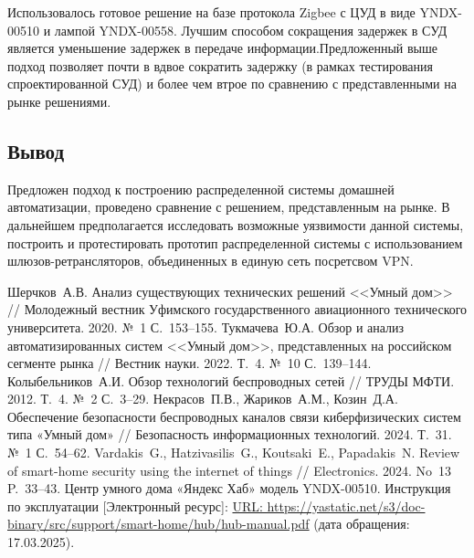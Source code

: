 \documentclass[a4paper,12pt]{article}
\begin{document}
Использовалось готовое решение на базе протокола Zigbee с ЦУД в виде YNDX-00510 \cite{YNDX_hub} и
лампой YNDX-00558. Лучшим способом сокращения задержек в СУД является уменьшение задержек в передаче
информации.Предложенный выше подход позволяет почти в вдвое сократить задержку (в рамках тестирования спроектированной
СУД) и более чем втрое по сравнению с представленными на рынке решениями.

\subsection{Вывод}
Предложен подход к построению распределенной системы домашней автоматизации, проведено сравнение с решением,
представленным на рынке. В дальнейшем предполагается исследовать возможные
уязвимости данной системы, построить и протестировать прототип распределенной системы с использованием шлюзов-ретрансляторов,
объединенных в единую сеть посретсвом VPN.

\newpage
\begin{thebibliography}{40}
 Шерчков~А.\:В. Анализ существующих технических решений <<Умный дом>> // Молодежный вестник Уфимского государственного авиационного технического университета. 2020. №~1 С.~153--155.
 Тукмачева~Ю.\:А. Обзор и анализ автоматизированных систем <<Умный дом>>, представленных на российском сегменте рынка // Вестник науки. 2022. Т.~4. №~10 С.~139--144.
 Колыбельников~А.\:И. Обзор технологий беспроводных сетей // ТРУДЫ МФТИ. 2012. Т.~4. №~2 С.~3--29.
 Некрасов~П.\:В., Жариков~А.\:М., Козин~Д.\:А. Обеспечение безопасности беспроводных каналов связи киберфизических систем типа «Умный дом» // Безопасность информационных технологий. 2024. Т.~31. №~1 С.~54--62.
 Vardakis~G., Hatzivasilis~G., Koutsaki~E., Papadakis~N. Review of smart-home security using the internet of things // Electronics. 2024. No~13 P.~33--43.
 Центр умного дома «Яндекс Хаб» модель YNDX-00510. Инструкция по эксплуатации [Электронный ресурс]: \url{URL: https://yastatic.net/s3/doc-binary/src/support/smart-home/hub/hub-manual.pdf} (дата обращения: 17.03.2025).

\end{thebibliography}
\end{document}
